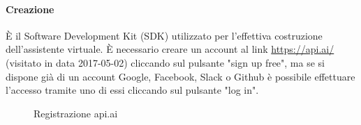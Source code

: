 \paragraph{Creazione}
È il Software Development Kit (SDK) utilizzato per l'effettiva costruzione dell'assistente virtuale.
È necessario creare un account al link \url{https://api.ai/} (visitato in data 2017-05-02) cliccando sul pulsante "sign up free", ma se si dispone già di un account Google, Facebook, Slack o Github è possibile effettuare l'accesso tramite uno di essi cliccando sul pulsante "log in".
\begin{figure}[h]
	\caption{Registrazione api.ai}
\end{figure}
